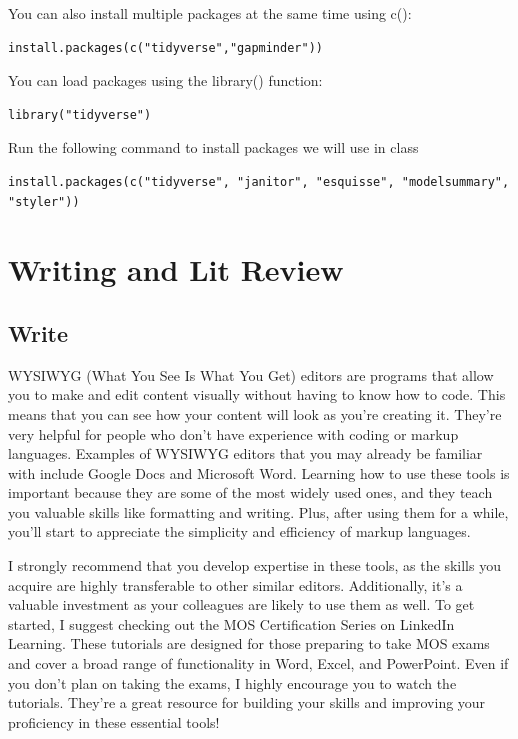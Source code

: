 \documentclass[
  letterpaper,
]{book}
\begin{document}
You can also install multiple packages at the same time using c():

\begin{verbatim}
install.packages(c("tidyverse","gapminder"))
\end{verbatim}

You can load packages using the library() function:

\begin{verbatim}
library("tidyverse")
\end{verbatim}

Run the following command to install packages we will use in class

\begin{verbatim}
install.packages(c("tidyverse", "janitor", "esquisse", "modelsummary", "styler"))
\end{verbatim}

\part{Writing and Lit Review}

\hypertarget{write}{%
\chapter{Write}\label{write}}

WYSIWYG (What You See Is What You Get) editors are programs that allow
you to make and edit content visually without having to know how to
code. This means that you can see how your content will look as you're
creating it. They're very helpful for people who don't have experience
with coding or markup languages. Examples of WYSIWYG editors that you
may already be familiar with include Google Docs and Microsoft Word.
Learning how to use these tools is important because they are some of
the most widely used ones, and they teach you valuable skills like
formatting and writing. Plus, after using them for a while, you'll start
to appreciate the simplicity and efficiency of markup languages.

I strongly recommend that you develop expertise in these tools, as the
skills you acquire are highly transferable to other similar editors.
Additionally, it's a valuable investment as your colleagues are likely
to use them as well. To get started, I suggest checking out the MOS
Certification Series on LinkedIn Learning. These tutorials are designed
for those preparing to take MOS exams and cover a broad range of
functionality in Word, Excel, and PowerPoint. Even if you don't plan on
taking the exams, I highly encourage you to watch the tutorials. They're
a great resource for building your skills and improving your proficiency
in these essential tools!
\end{document}
